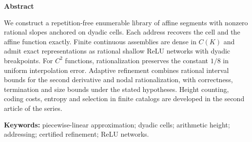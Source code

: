 \begin{abstract}
Construímos uma biblioteca enumerável, sem repetições, de segmentos afins de inclinação racional não nula ancorados em células diádicas. Cada endereço recupera exatamente a célula e a função afim. Montagens contínuas finitas são densas em $C(K)$ e admitem representação exata por redes ReLU rasas racionais com quebras diádicas. Para funções $C^2$, a racionalização preserva a constante $1/8$ do erro interpolatório uniforme. O refinamento adaptativo combina majorantes intervalares racionais da segunda derivada e racionalização nodal, com correção, término e tamanho controlados sob as hipóteses explicitadas. A contagem por altura, os custos de codificação, a entropia e a seleção em catálogos finitos são desenvolvidos no segundo artigo da série.

\smallskip\noindent\textbf{Palavras-chave:} aproximação linear por partes; células diádicas; altura aritmética; endereçamento; refinamento certificado; redes ReLU.
\end{abstract}

\begingroup\small
\begin{center}\textbf{Abstract}\end{center}
\noindent We construct a repetition-free enumerable library of affine segments with nonzero rational slopes anchored on dyadic cells. Each address recovers the cell and the affine function exactly. Finite continuous assemblies are dense in $C(K)$ and admit exact representations as rational shallow ReLU networks with dyadic breakpoints. For $C^2$ functions, rationalization preserves the constant $1/8$ in uniform interpolation error. Adaptive refinement combines rational interval bounds for the second derivative and nodal rationalization, with correctness, termination and size bounds under the stated hypotheses. Height counting, coding costs, entropy and selection in finite catalogs are developed in the second article of the series.

\smallskip\noindent\textbf{Keywords:} piecewise-linear approximation; dyadic cells; arithmetic height; addressing; certified refinement; ReLU networks.
\endgroup
